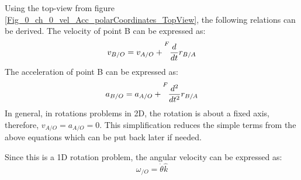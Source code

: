 Using the top-view from figure \ref{Fig_0_ch_0_vel_Acc_polarCoordinates_TopView}, the following relations can be derived.
The velocity of point B can be expressed as:
\begin{equation} \label{Eq_0_ch_0_velocityPCD}
	v_{B/O} = v_{A/O} + \prescript{F}{}{\frac{d}{dt}r_{B/A}}
\end{equation}
The acceleration of point B can be expressed as:
\begin{equation} \label{Eq_0_ch_0_accelerationPCD}
	a_{B/O} = a_{A/O}+ \prescript{F}{}{\frac{d^{2}}{dt^{2}}r_{B/A}}
\end{equation}
In general, in rotations problems in 2D, the rotation is about a fixed axis, therefore, $v_{A/O} = a_{A/O} = 0$. This simplification reduces the simple terms from the above equations which can be put back later if needed.

Since this is a 1D rotation problem, the angular velocity can be expressed as:
\begin{equation}
	\omega_{/O} = \dot{\theta}\hat{k}
\end{equation}

